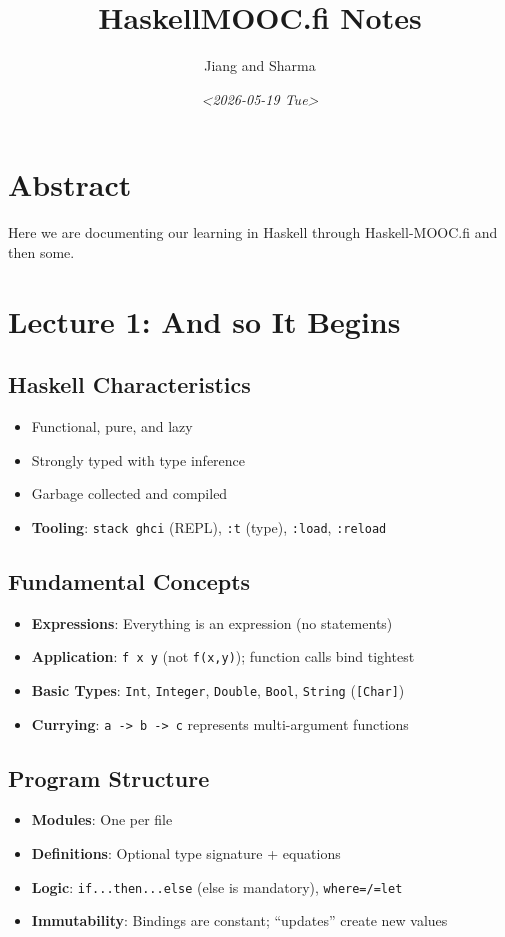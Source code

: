 \documentclass[11pt,twoside=off,openright,numbers=noenddot]{scrbook}
\author{Jiang and Sharma}
\date{\textit{<2026-05-19 Tue>}}
\title{HaskellMOOC.fi Notes}
\begin{document}
\maketitle
\tableofcontents

\chapter*{Abstract}
\label{sec:org3a1872b}

Here we are documenting our learning in Haskell through Haskell-MOOC.fi and then some.
\chapter{Lecture 1: And so It Begins}
\label{sec:org74b95ff}
\section{Haskell Characteristics}
\label{sec:org20221f6}
\begin{itemize}
\item Functional, pure, and lazy
\item Strongly typed with type inference
\item Garbage collected and compiled
\item \textbf{Tooling}: \texttt{stack ghci} (REPL), \texttt{:t} (type), \texttt{:load}, \texttt{:reload}
\end{itemize}
\section{Fundamental Concepts}
\label{sec:org33be1ca}
\begin{itemize}
\item \textbf{Expressions}: Everything is an expression (no statements)
\item \textbf{Application}: \texttt{f x y} (not \texttt{f(x,y)}); function calls bind tightest
\item \textbf{Basic Types}: \texttt{Int}, \texttt{Integer}, \texttt{Double}, \texttt{Bool}, \texttt{String} (\texttt{[Char]})
\item \textbf{Currying}: \texttt{a -> b -> c} represents multi-argument functions
\end{itemize}
\section{Program Structure}
\label{sec:orgfadcb47}
\begin{itemize}
\item \textbf{Modules}: One per file
\item \textbf{Definitions}: Optional type signature + equations
\item \textbf{Logic}: \texttt{if...then...else} (else is mandatory), \texttt{where=/=let}
\item \textbf{Immutability}: Bindings are constant; ``updates'' create new values
\end{itemize}
\end{document}
